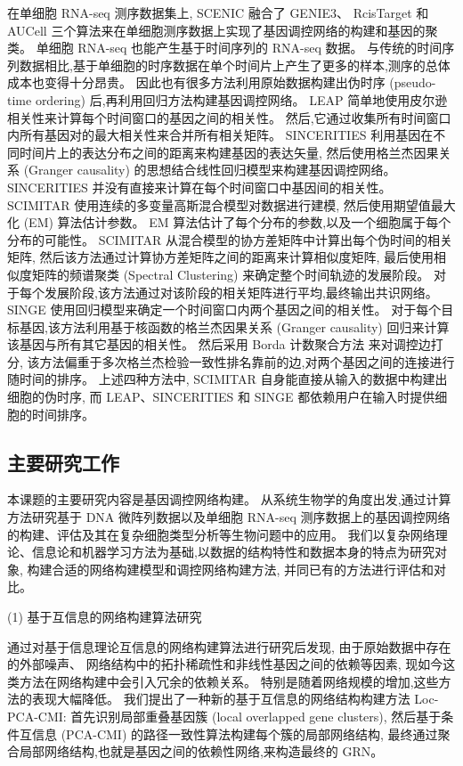 在单细胞 RNA-seq 测序数据集上, 
SCENIC \cite{aibar2017scenic} 融合了 GENIE3、 RcisTarget 和 AUCell 三个算法来在单细胞测序数据上实现了基因调控网络的构建和基因的聚类。
单细胞 RNA-seq 也能产生基于时间序列的 RNA-seq 数据。
与传统的时间序列数据相比,基于单细胞的时序数据在单个时间片上产生了更多的样本,测序的总体成本也变得十分昂贵。
因此也有很多方法利用原始数据构建出伪时序 (pseudo-time ordering) 后,再利用回归方法构建基因调控网络。
LEAP \cite{specht2017leap} 简单地使用皮尔逊相关性来计算每个时间窗口的基因之间的相关性。 
然后,它通过收集所有时间窗口内所有基因对的最大相关性来合并所有相关矩阵。
SINCERITIES \cite{papili2017sincerities} 利用基因在不同时间片上的表达分布之间的距离来构建基因的表达矢量,
然后使用格兰杰因果关系 (Granger causality) 的思想结合线性回归模型来构建基因调控网络。
SINCERITIES 并没有直接来计算在每个时间窗口中基因间的相关性。
SCIMITAR \cite{cordero2017tracing} 使用连续的多变量高斯混合模型对数据进行建模,
然后使用期望值最大化 (EM) 算法估计参数。
EM 算法估计了每个分布的参数,以及一个细胞属于每个分布的可能性。
SCIMITAR 从混合模型的协方差矩阵中计算出每个伪时间的相关矩阵,
然后该方法通过计算协方差矩阵之间的距离来计算相似度矩阵,
最后使用相似度矩阵的频谱聚类 (Spectral Clustering) 来确定整个时间轨迹的发展阶段。
对于每个发展阶段,该方法通过对该阶段的相关矩阵进行平均,最终输出共识网络。
SINGE \cite{deshpande2019network} 使用回归模型来确定一个时间窗口内两个基因之间的相关性。
对于每个目标基因,该方法利用基于核函数的格兰杰因果关系 (Granger causality) 回归来计算该基因与所有其它基因的相关性。
然后采用 Borda 计数聚合方法 \cite{van2000variants} 来对调控边打分,
该方法偏重于多次格兰杰检验一致性排名靠前的边,对两个基因之间的连接进行随时间的排序。
上述四种方法中, SCIMITAR 自身能直接从输入的数据中构建出细胞的伪时序, 
而 LEAP、SINCERITIES 和 SINGE 都依赖用户在输入时提供细胞的时间排序。

\subsection{主要研究工作}
本课题的主要研究内容是基因调控网络构建。
从系统生物学的角度出发,通过计算方法研究基于 DNA 微阵列数据以及单细胞 RNA-seq 测序数据上的基因调控网络的构建、评估及其在复杂细胞类型分析等生物问题中的应用。
我们以复杂网络理论、信息论和机器学习方法为基础,以数据的结构特性和数据本身的特点为研究对象,
构建合适的网络构建模型和调控网络构建方法,
并同已有的方法进行评估和对比。

(1) 基于互信息的网络构建算法研究

通过对基于信息理论互信息的网络构建算法进行研究后发现,
由于原始数据中存在的外部噪声、
网络结构中的拓扑稀疏性和非线性基因之间的依赖等因素,
现如今这类方法在网络构建中会引入冗余的依赖关系。
特别是随着网络规模的增加,这些方法的表现大幅降低。
我们提出了一种新的基于互信息的网络结构构建方法 Loc-PCA-CMI:
首先识别局部重叠基因簇 (local overlapped gene clusters),
然后基于条件互信息 (PCA-CMI) 的路径一致性算法构建每个簇的局部网络结构,
最终通过聚合局部网络结构,也就是基因之间的依赖性网络,来构造最终的 GRN。

